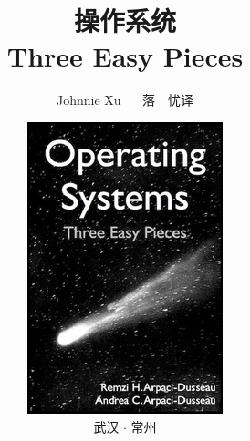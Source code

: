 
\title{{\Huge 操作系统}\\{\LARGE Three Easy Pieces}}
\author{Johnnie Xu ~~ 落~~忧\hspace{1em}译}
\date{\vspace*{3cm}\centering\includegraphics[totalheight=1.5in]{fig/operating-systems.jpeg}\\武汉 $\cdot$ 常州}
\maketitle
